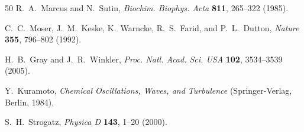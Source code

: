 \documentclass[twocolumn,aps,prx,superscriptaddress,longbibliography]{revtex4-2}
\theoremstyle{remark}
\begin{document}
\begin{thebibliography}{50}
R.~A.~Marcus and N.~Sutin,
\textit{Biochim. Biophys. Acta} \textbf{811}, 265--322 (1985).

C.~C.~Moser, J.~M.~Keske, K.~Warncke, R.~S.~Farid, and P.~L.~Dutton,
\textit{Nature} \textbf{355}, 796--802 (1992).

H.~B.~Gray and J.~R.~Winkler,
\textit{Proc. Natl. Acad. Sci. USA} \textbf{102}, 3534--3539 (2005).


Y.~Kuramoto,
\textit{Chemical Oscillations, Waves, and Turbulence}
(Springer-Verlag, Berlin, 1984).

S.~H.~Strogatz,
\textit{Physica D} \textbf{143}, 1--20 (2000).

\end{thebibliography}
\end{document}
